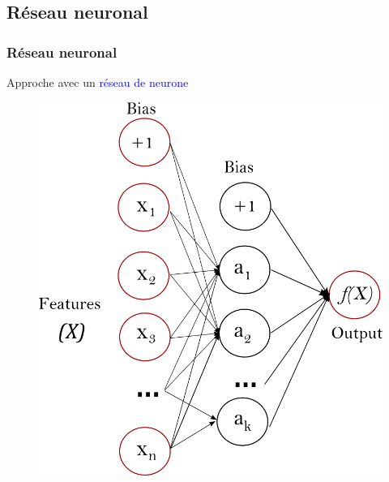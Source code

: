 \documentclass{beamer}[aspectratio = 43]
\begin{document}
\subsection{Réseau neuronal}
\begin{frame}
	\frametitle{Réseau neuronal}
	Approche avec un \textcolor{blue}{réseau de neurone}
	\begin{figure}[t]
		\centering
		\begin{minipage}{0.5\textwidth}
			\includegraphics[scale=0.2]{nn_sk}
		\end{minipage}
	\end{figure}
\end{frame}
\end{document}
